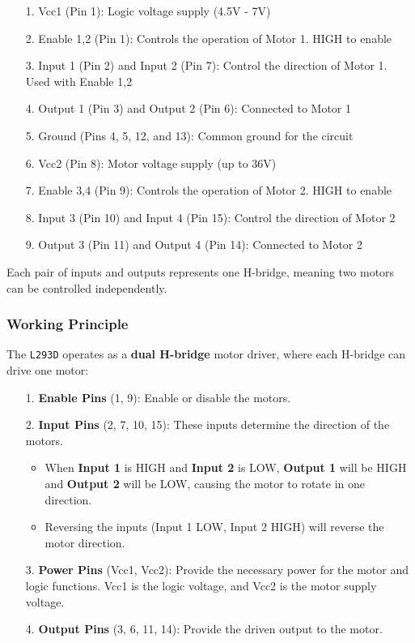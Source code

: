 \documentclass[a4paper,12pt]{article}
\begin{document}
\begin{itemize}
    \item[1.]	Vcc1 (Pin 1): Logic voltage supply (4.5V - 7V)
    \item[2.]	Enable 1,2 (Pin 1): Controls the operation of Motor 1. HIGH to enable
    \item[3.]	Input 1 (Pin 2) and Input 2 (Pin 7): Control the direction of Motor 1. Used with Enable 1,2
    \item[4.]	Output 1 (Pin 3) and Output 2 (Pin 6): Connected to Motor 1
    \item[5.]	Ground (Pins 4, 5, 12, and 13): Common ground for the circuit
    \item[6.]	Vcc2 (Pin 8): Motor voltage supply (up to 36V)
    \item[7.]	Enable 3,4 (Pin 9): Controls the operation of Motor 2. HIGH to enable
    \item[8.]	Input 3 (Pin 10) and Input 4 (Pin 15): Control the direction of Motor 2
    \item[9.]	Output 3 (Pin 11) and Output 4 (Pin 14): Connected to Motor 2
\end{itemize}
Each pair of inputs and outputs represents one H-bridge, meaning two motors can be controlled independently.

\subsubsection{Working Principle}
The \texttt{L293D} operates as a \textbf{dual H-bridge} motor driver, where each H-bridge can drive one motor:
\begin{itemize}
    \item[1.] \textbf{Enable Pins} (1, 9): Enable or disable the motors.
    \item[2.] \textbf{Input Pins} (2, 7, 10, 15): These inputs determine the direction of the motors.
          \begin{itemize}
              \item When \textbf{Input 1} is HIGH and \textbf{Input 2} is LOW, \textbf{Output 1} will be HIGH and \textbf{Output 2} will be LOW, causing the motor to rotate in one direction.
              \item Reversing the inputs (Input 1 LOW, Input 2 HIGH) will reverse the motor direction.
          \end{itemize}
    \item[3.] \textbf{Power Pins} (Vcc1, Vcc2): Provide the necessary power for the motor and logic functions. Vcc1 is the logic voltage, and Vcc2 is the motor supply voltage.
    \item[4.] \textbf{Output Pins} (3, 6, 11, 14): Provide the driven output to the motor.
\end{itemize}
\end{document}
